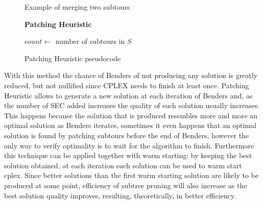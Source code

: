 \begin{figure}[htbp]
\begin{center}
	\end{center}
	\caption{Example of merging two subtours} \label{fig:examplePatching}
\end{figure}

\begin{figure}[htbp]
	\textbf{Patching Heuristic} \\
	\begin{algorithm}[H]
		\vspace{2mm}
		$count \gets$ number of subtours in $S$ \\
	\end{algorithm}
	\caption{Patching Heuristic pseudocode} \label{fig:patchHeur}
\end{figure}

With this method the chance of Benders of not producing any solution is greatly reduced, but not nullified since CPLEX needs to finish at least once.
Patching Heuristic allows to generate a new solution at each iteration of Benders and, as the number of SEC added increases the quality of such solution usually increases.
This happens because the solution that is produced resembles more and more an optimal solution as Benders iterates, sometimes it even happens that an optimal solution is found by patching subtours before the end of Benders, however the only way to verify optimality is to wait for the algorithm to finish.
Furthermore this technique can be applied together with warm starting: by keeping the best solution obtained, at each iteration such solution can be used to warm start cplex.
Since better solutions than the first warm starting solution are likely to be produced at some point, efficiency of subtree pruning will also increase as the best solution quality improves, resulting, theoretically, in better efficiency.

